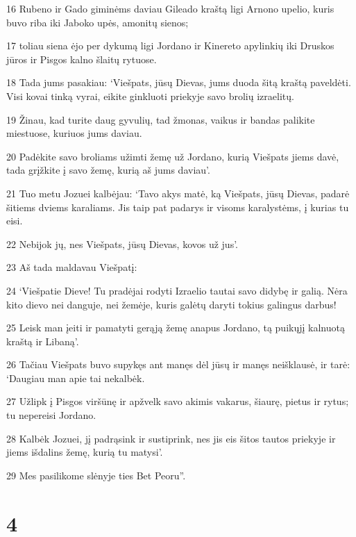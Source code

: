 \par 16 Rubeno ir Gado giminėms daviau Gileado kraštą ligi Arnono upelio, kuris buvo riba iki Jaboko upės, amonitų sienos; 
\par 17 toliau siena ėjo per dykumą ligi Jordano ir Kinereto apylinkių iki Druskos jūros ir Pisgos kalno šlaitų rytuose. 
\par 18 Tada jums pasakiau: ‘Viešpats, jūsų Dievas, jums duoda šitą kraštą paveldėti. Visi kovai tinką vyrai, eikite ginkluoti priekyje savo brolių izraelitų. 
\par 19 Žinau, kad turite daug gyvulių, tad žmonas, vaikus ir bandas palikite miestuose, kuriuos jums daviau. 
\par 20 Padėkite savo broliams užimti žemę už Jordano, kurią Viešpats jiems davė, tada grįžkite į savo žemę, kurią aš jums daviau’. 
\par 21 Tuo metu Jozuei kalbėjau: ‘Tavo akys matė, ką Viešpats, jūsų Dievas, padarė šitiems dviems karaliams. Jis taip pat padarys ir visoms karalystėms, į kurias tu eisi. 
\par 22 Nebijok jų, nes Viešpats, jūsų Dievas, kovos už jus’. 
\par 23 Aš tada maldavau Viešpatį: 
\par 24 ‘Viešpatie Dieve! Tu pradėjai rodyti Izraelio tautai savo didybę ir galią. Nėra kito dievo nei danguje, nei žemėje, kuris galėtų daryti tokius galingus darbus! 
\par 25 Leisk man įeiti ir pamatyti gerąją žemę anapus Jordano, tą puikųjį kalnuotą kraštą ir Libaną’. 
\par 26 Tačiau Viešpats buvo supykęs ant manęs dėl jūsų ir manęs neišklausė, ir tarė: ‘Daugiau man apie tai nekalbėk. 
\par 27 Užlipk į Pisgos viršūnę ir apžvelk savo akimis vakarus, šiaurę, pietus ir rytus; tu nepereisi Jordano. 
\par 28 Kalbėk Jozuei, jį padrąsink ir sustiprink, nes jis eis šitos tautos priekyje ir jiems išdalins žemę, kurią tu matysi’. 
\par 29 Mes pasilikome slėnyje ties Bet Peoru”.



\chapter{4}


